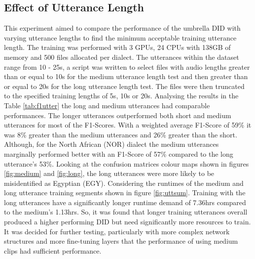 \begin{figure}[H]
\end{figure}


\subsection{Effect of Utterance Length}\label{sect:uttExp}
This experiment aimed to compare the performance of the umbrella DID with varying utterance lengths to find the 
minimum acceptable training utterance length. The training was performed with 3 GPUs, 24 CPUs with 138GB of memory 
and 500 files allocated per dialect. The utterances within the dataset range from 10 - 25s, a script was written to select files with audio lengths greater than or equal to 10s for the medium utterance length test 
and then greater than or equal to 20s for the long utterance length test. The files were then truncated to the specified training lengths of 5s, 
10s or 20s. Analysing the results in the Table \ref{tab:f1utter} the long and medium utterances had comparable performances. The longer utterances  
outperformed both short and medium utterances for most of the F1-Scores. With a weighted average F1-Score of 59\% it was 8\% greater than the medium utterances and 26\% greater than the short. 
Although, for the North African (NOR) dialect the medium utterances marginally performed better with an F1-Score of 57\% compared to the long utterance's 53\%. Looking at the 
confusion matrices colour maps shown in figures \ref{fig:medium} and \ref{fig:long}, the long utterances were more likely to be misidentified as Egyptian (EGY). 
Considering the runtimes of the medium and long utterance training segments shown in figure \ref{fig:uttsum}. Training with the long utterances have a significantly longer 
runtime demand of 7.36hrs compared to the medium's 1.13hrs. So, it was found that longer training utterances overall produced a higher performing DID but need significantly 
more resources to train. It was decided for further testing, particularly with more complex network structures and more fine-tuning layers that the performance of using medium clips 
had sufficient performance. 

